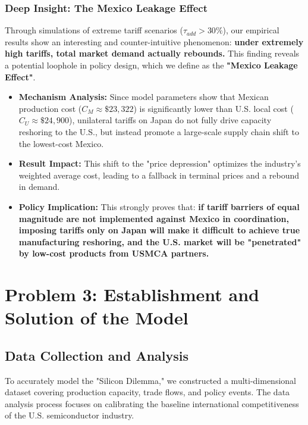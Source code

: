 \documentclass{apmcmthesis}
\begin{document}
\subsubsection{Deep Insight: The Mexico Leakage Effect}
Through simulations of extreme tariff scenarios ($\tau_{add} > 30\%$), our empirical results show an interesting and counter-intuitive phenomenon: \textbf{under extremely high tariffs, total market demand actually rebounds.} This finding reveals a potential loophole in policy design, which we define as the \textbf{"Mexico Leakage Effect"}.

\begin{itemize}
    \item \textbf{Mechanism Analysis:} Since model parameters show that Mexican production cost ($C_M \approx \$23,322$) is significantly lower than U.S. local cost ($C_U \approx \$24,900$), unilateral tariffs on Japan do not fully drive capacity reshoring to the U.S., but instead promote a large-scale supply chain shift to the lowest-cost Mexico.
    \item \textbf{Result Impact:} This shift to the "price depression" optimizes the industry's weighted average cost, leading to a fallback in terminal prices and a rebound in demand.
    \item \textbf{Policy Implication:} This strongly proves that: \textbf{if tariff barriers of equal magnitude are not implemented against Mexico in coordination, imposing tariffs only on Japan will make it difficult to achieve true manufacturing reshoring, and the U.S. market will be "penetrated" by low-cost products from USMCA partners.}
\end{itemize}




\section{Problem 3: Establishment and Solution of the Model}

\subsection{Data Collection and Analysis}
To accurately model the "Silicon Dilemma," we constructed a multi-dimensional dataset covering production capacity, trade flows, and policy events. The data analysis process focuses on calibrating the baseline international competitiveness of the U.S. semiconductor industry.
\end{document}
